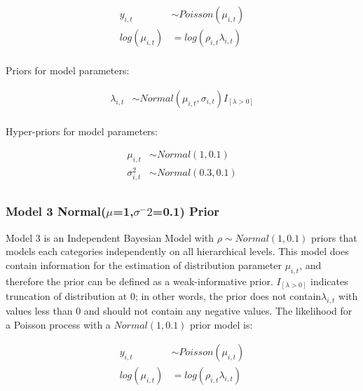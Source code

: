 \begin{equation*} \label{Poissonm2a}
\begin{aligned}
y_{i,t} & \sim Poisson(\mu_{i,t}) \\  
log(\mu_{i,t}) & = log(\rho_{i,t}\lambda_{i,t}) \\
\end{aligned}
\end{equation*}

Priors for model parameters:

\begin{equation*} \label{Poissonm2b}
\begin{aligned}
\lambda_{i,t} & \sim Normal(\mu_{i,t},\sigma_{i,t}) I_{[\lambda>0]}\\
\end{aligned}
\end{equation*}

Hyper-priors for model parameters:

\begin{equation*} \label{Poissonm2c}
\begin{aligned}
\mu_{i,t} & \sim Normal(1,0.1)\\
\sigma^2_{i,t} &\sim Normal(0.3,0.1)\\
\end{aligned}
\end{equation*}

\subsubsection{Model 3 Normal($\mu$=1,$\sigma^-2$=0.1) Prior}

Model 3 is an Independent Bayesian Model with $\rho \sim Normal(1, 0.1)$ priors that models each categories independently on all hierarchical levels. This model does contain information for the estimation of distribution parameter $\mu_{i,t}$, and therefore the prior can be defined as a weak-informative prior. $I_{[\lambda>0]}$ indicates truncation of distribution at 0; in other words, the prior does not contain$\lambda_{i,t}$ with values less than 0 and should not contain any negative values. The likelihood for a Poisson process with a $Normal(1, 0.1)$ prior model is:

\begin{equation*} \label{Poissonm3a}
\begin{aligned}
y_{i,t} & \sim Poisson(\mu_{i,t}) \\  
log(\mu_{i,t}) & = log(\rho_{i,t}\lambda_{i,t}) \\
\end{aligned}
\end{equation*}

